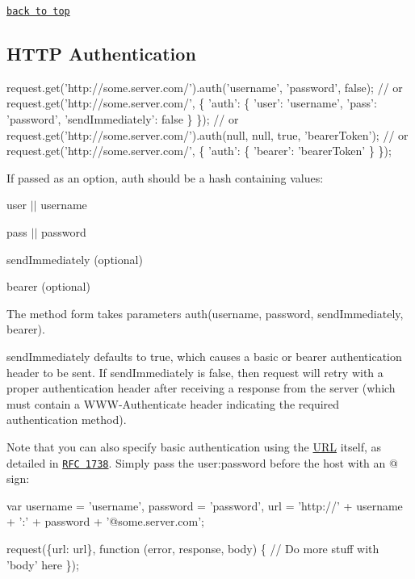 \href{#table-of-contents}{\tt back to top}





\subsection*{H\+T\+TP Authentication}


\begin{DoxyCode}
request.get('http://some.server.com/').auth('username', 'password', false);
// or
request.get('http://some.server.com/', \{
  'auth': \{
    'user': 'username',
    'pass': 'password',
    'sendImmediately': false
  \}
\});
// or
request.get('http://some.server.com/').auth(null, null, true, 'bearerToken');
// or
request.get('http://some.server.com/', \{
  'auth': \{
    'bearer': 'bearerToken'
  \}
\});
\end{DoxyCode}


If passed as an option, {\ttfamily auth} should be a hash containing values\+:


\begin{DoxyItemize}
\item {\ttfamily user} $\vert$$\vert$ {\ttfamily username}
\item {\ttfamily pass} $\vert$$\vert$ {\ttfamily password}
\item {\ttfamily send\+Immediately} (optional)
\item {\ttfamily bearer} (optional)
\end{DoxyItemize}

The method form takes parameters {\ttfamily auth(username, password, send\+Immediately, bearer)}.

{\ttfamily send\+Immediately} defaults to {\ttfamily true}, which causes a basic or bearer authentication header to be sent. If {\ttfamily send\+Immediately} is {\ttfamily false}, then {\ttfamily request} will retry with a proper authentication header after receiving a {} response from the server (which must contain a {\ttfamily W\+W\+W-\/\+Authenticate} header indicating the required authentication method).

Note that you can also specify basic authentication using the \mbox{\hyperlink{namespace_u_r_l}{U\+RL}} itself, as detailed in \href{http://www.ietf.org/rfc/rfc1738.txt}{\tt R\+FC 1738}. Simply pass the {\ttfamily user\+:password} before the host with an {\ttfamily @} sign\+:


\begin{DoxyCode}
var username = 'username',
    password = 'password',
    url = 'http://' + username + ':' + password + '@some.server.com';

request(\{url: url\}, function (error, response, body) \{
   // Do more stuff with 'body' here
\});
\end{DoxyCode}


